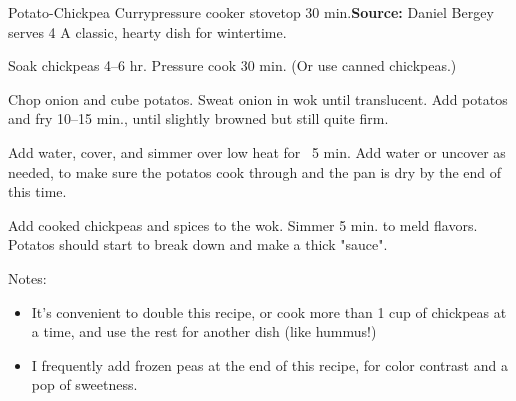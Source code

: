 \begin{recipe}{Potato-Chickpea Curry}{pressure cooker \hfill stovetop \hfill 30 min.}{\textbf{Source:} Daniel Bergey \hfill serves 4}
  \freeform A classic, hearty dish for wintertime.

Soak chickpeas 4--6 hr. Pressure cook 30 min. (Or use canned chickpeas.)

Chop onion and cube potatos. Sweat onion in wok until translucent. Add potatos and fry 10--15 min., until slightly browned but still quite firm.

Add water, cover, and simmer over low heat for ~5 min. Add water or uncover as needed, to make sure the potatos cook through and the pan is dry by the end of this time.

Add cooked chickpeas and spices to the wok. Simmer 5 min. to meld flavors. Potatos should start to break down and make a thick "sauce".

\freeform Notes:
\begin{itemize}
  \item It's convenient to double this recipe, or cook more than 1 cup of chickpeas at a time, and use the rest for another dish (like hummus!)
  \item I frequently add frozen peas at the end of this recipe, for color contrast and a pop of sweetness.
\end{itemize}
\end{recipe}